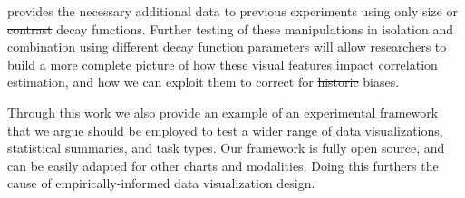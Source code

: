 \documentclass[manuscript, review, anonymous, screen]{acmart}
\providecommand{\DIFaddtex}[1]{{\protect\color{blue}\uwave{#1}}} %
\providecommand{\DIFdeltex}[1]{{\protect\color{red}\sout{#1}}}                      %
\providecommand{\DIFaddbegin}{} %
\providecommand{\DIFaddend}{} %
\providecommand{\DIFdelbegin}{} %
\providecommand{\DIFdelend}{} %
\providecommand{\DIFadd}[1]{\texorpdfstring{\DIFaddtex{#1}}{#1}} %
\providecommand{\DIFdel}[1]{\texorpdfstring{\DIFdeltex{#1}}{}} %
\newcommand{\DIFscaledelfig}{0.5}
\newlength{\DIFdelgraphicswidth} %
\newlength{\DIFdelgraphicsheight} %
\newcommand{\DIFaddincludegraphics}[2][]{{\color{blue}\fbox{\DIFOincludegraphics[#1]{#2}}}} %
\newcommand{\DIFdelincludegraphics}[2][]{%
\sbox{\DIFdelgraphicsbox}{\DIFOincludegraphics[#1]{#2}}%
\settoboxwidth{\DIFdelgraphicswidth}{\DIFdelgraphicsbox} %
\settoboxtotalheight{\DIFdelgraphicsheight}{\DIFdelgraphicsbox} %
\scalebox{\DIFscaledelfig}{%
\parbox[b]{\DIFdelgraphicswidth}{\usebox{\DIFdelgraphicsbox}\\[-\baselineskip] \rule{\DIFdelgraphicswidth}{0em}}\llap{\resizebox{\DIFdelgraphicswidth}{\DIFdelgraphicsheight}{%
\setlength{\unitlength}{\DIFdelgraphicswidth}%
\begin{picture}(1,1)%
\thicklines\linethickness{2pt} %
{\color[rgb]{1,0,0}\put(0,0){\framebox(1,1){}}}%
{\color[rgb]{1,0,0}\put(0,0){\line( 1,1){1}}}%
{\color[rgb]{1,0,0}\put(0,1){\line(1,-1){1}}}%
\end{picture}%
}\hspace*{3pt}}} %
} %
\DeclareRobustCommand{\DIFaddbegin}{\DIFOaddbegin \let\includegraphics\DIFaddincludegraphics} %
\DeclareRobustCommand{\DIFaddend}{\DIFOaddend \let\includegraphics\DIFOincludegraphics} %
\DeclareRobustCommand{\DIFdelbegin}{\DIFOdelbegin \let\includegraphics\DIFdelincludegraphics} %
\DeclareRobustCommand{\DIFdelend}{\DIFOaddend \let\includegraphics\DIFOincludegraphics} %
\begin{document}
provides the necessary additional data to previous experiments using
only size \citep{strain_2023b} or \DIFdelbegin \DIFdel{contrast }\DIFdelend \DIFaddbegin \DIFadd{opacity }\DIFaddend \citep{strain_2023} decay
functions. Further testing of these manipulations in isolation and
combination using different decay function parameters will allow
researchers to build a more complete picture of how these visual
features impact correlation estimation, and how we can exploit them to
correct for \DIFdelbegin \DIFdel{historic }\DIFdelend \DIFaddbegin \DIFadd{well-known }\DIFaddend biases.

Through this work we also provide an example of an experimental
framework that we argue should be employed to test a wider range of data
visualizations, statistical summaries, and task types. Our framework is
fully open source, and can be easily adapted for other charts and
modalities. Doing this furthers the cause of empirically-informed data
visualization design.




\end{document}
